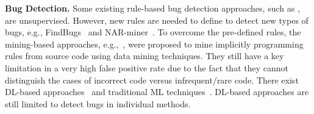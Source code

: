 \textbf{Bug Detection.}
Some existing rule-based bug detection approaches,
such as
\cite{Bian-2018,Jin-2012,Olivo-2015,Engler-2001,Cole-2006,Toman-2017},
are unsupervised. However, new rules are needed to
define to detect new types of bugs, e.g., FindBugs~\cite{Hovemeyer-2007} and NAR-miner~\cite{Bian-2018}.
%
To overcome the pre-defined rules, the mining-based approaches, e.g.,~\cite{Bian-2018,Jin-2012,Olivo-2015,Engler-2001,Cole-2006,Toman-2017,Li-2005}, were proposed to mine implicitly programming rules from source code using data mining techniques. 
They still have a key limitation in a very high false positive rate
due to the fact that they cannot distinguish the cases of incorrect
code versus infrequent/rare code.  There exist DL-based
approaches~\cite{Pradel-2018,Wang-2016b} and traditional ML
techniques~\cite{Engler-2001,Li-2005,Wasylkowski-2017,
  Wang-2016b,Wang-2016,Liang-2016}.
DL-based approaches are still limited to detect bugs in individual
methods.

